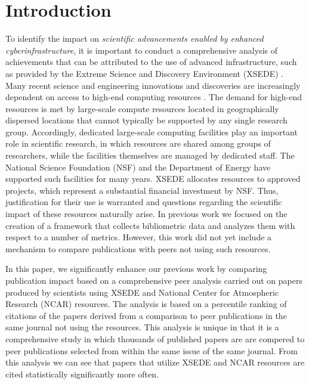 \documentclass[10pt, conference, compsocconf]{IEEEtran}
\begin{document}
\begin{comment}
\vspace{-6pt}


\category{H.4}{Information Systems Applications}{Miscellaneous}
\category{D.2.8}{Software Engineering}{Metrics}[complexity measures,
performance measures]

\terms{Theory, Measurement}

\keywords{Scientific impact, bibliometric, h-index, Technology Audit
  Service, XDMoD, XSEDE}
\end{comment}

\section{Introduction} 

To identify the impact on {\em scientific advancements enabled by enhanced cyberinfrastructure}, it is important to conduct a comprehensive analysis of achievements that can be attributed to the use of advanced infrastructure, such as provided by the Extreme Science and Discovery Environment (XSEDE) \cite{www-xsede,xsede}. Many recent science and engineering innovations and discoveries are increasingly dependent on access to high-end computing resources \cite{las14impact}. The demand for high-end resources is met by large-scale compute resources located in geographically dispersed locations that cannot typically be supported by any single research group. Accordingly, dedicated large-scale computing facilities play an important role in scientific research, in which resources are shared among groups of researchers, while the facilities themselves are managed by dedicated staff. The National Science Foundation (NSF) and the Department of Energy have supported such facilities for many years. XSEDE allocates resources to approved projects, which represent a substantial financial investment by NSF. Thus, justification for their use is warranted and questions regarding the scientific impact of these resources naturally arise. In previous work \cite{las14impact} we focused on the creation of a framework that collects bibliometric data and analyzes them with respect to a number of metrics. However, this work did not yet include a mechanism to compare publications with peers not using such resources.

In this paper, we significantly enhance our previous work by comparing publication impact based on a comprehensive peer analysis carried out on papers produced by scientists using XSEDE and National Center for Atmospheric Research (NCAR) resources. The analysis is based on a percentile ranking of citations of the papers derived from a comparison to peer publications in the same journal not using the resources.  This analysis is unique in that it is a comprehensive study in which thousands of published papers are are compered to peer publications selected from within the same issue of the same journal. From this analysis we can see that papers that utilize XSEDE and NCAR resources are cited statistically significantly more often.  
\end{document}
